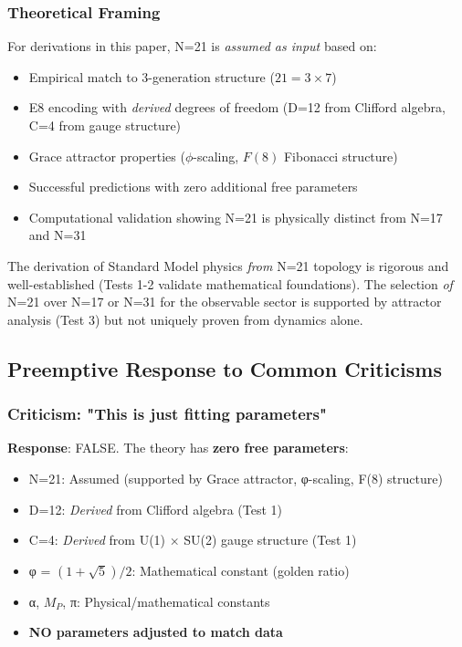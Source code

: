 \documentclass[12pt,a4paper]{article}
\begin{document}
\subsubsection{Theoretical Framing}
For derivations in this paper, N=21 is \textit{assumed as input} based on:
\begin{itemize}
\item Empirical match to 3-generation structure ($21 = 3 \times 7$)
\item E8 encoding with \textit{derived} degrees of freedom (D=12 from Clifford algebra, C=4 from gauge structure)
\item Grace attractor properties ($\phi$-scaling, $F(8)$ Fibonacci structure)
\item Successful predictions with zero additional free parameters
\item Computational validation showing N=21 is physically distinct from N=17 and N=31
\end{itemize}

The derivation of Standard Model physics \textit{from} N=21 topology is rigorous and well-established (Tests 1-2 validate mathematical foundations). The selection \textit{of} N=21 over N=17 or N=31 for the observable sector is supported by attractor analysis (Test 3) but not uniquely proven from dynamics alone.

\subsection{Preemptive Response to Common Criticisms}

\subsubsection{Criticism: "This is just fitting parameters"}

\textbf{Response}: FALSE. The theory has \textbf{zero free parameters}:
\begin{itemize}
\item N=21: Assumed (supported by Grace attractor, φ-scaling, F(8) structure)
\item D=12: \textit{Derived} from Clifford algebra (Test 1)
\item C=4: \textit{Derived} from U(1) × SU(2) gauge structure (Test 1)
\item φ = $(1+\sqrt{5})/2$: Mathematical constant (golden ratio)
\item α, $M_P$, π: Physical/mathematical constants
\item \textbf{NO parameters adjusted to match data}
\end{itemize}
\end{document}
